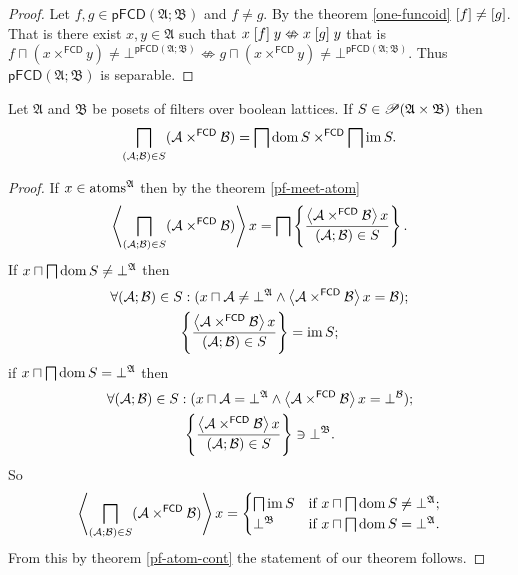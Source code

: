\begin{proof}
Let $f,g\in\mathsf{pFCD}(\mathfrak{A};\mathfrak{B})$ and $f\neq g$.
By the theorem \ref{one-funcoid} $\mathord{\mathrel{\left[f\right]}}\neq\mathord{\mathrel{\left[g\right]}}$.
That is there exist $x,y\in\mathfrak{A}$ such that $x\mathrel{\left[f\right]}y\nLeftrightarrow x\mathrel{\left[g\right]}y$
that is $f\sqcap(x\times^{\mathsf{FCD}}y)\neq\bot^{\mathsf{pFCD}(\mathfrak{A};\mathfrak{B})}\nLeftrightarrow g\sqcap(x\times^{\mathsf{FCD}}y)\neq\bot^{\mathsf{pFCD}(\mathfrak{A};\mathfrak{B})}$.
Thus $\mathsf{pFCD}(\mathfrak{A};\mathfrak{B})$ is separable.\end{proof}
\begin{thm}
Let $\mathfrak{A}$ and $\mathfrak{B}$ be posets of filters over
boolean lattices. If $S\in\mathscr{P}(\mathfrak{A}\times\mathfrak{B})$
then
\[
\bigsqcap_{(\mathcal{A};\mathcal{B})\in S}(\mathcal{A}\times^{\mathsf{FCD}}\mathcal{B})=\bigsqcap\operatorname{dom} S\times^{\mathsf{FCD}}\bigsqcap\operatorname{im} S.
\]
\end{thm}
\begin{proof}
If $x\in\operatorname{atoms}^{\mathfrak{A}}$ then by the theorem \ref{pf-meet-atom}
\[
\left\langle \bigsqcap_{(\mathcal{A};\mathcal{B})\in S}(\mathcal{A}\times^{\mathsf{FCD}}\mathcal{B})\right\rangle x=\bigsqcap\left\{ \frac{\left\langle \mathcal{A}\times^{\mathsf{FCD}}\mathcal{B}\right\rangle x}{(\mathcal{A};\mathcal{B})\in S}\right\}.
\]
If $x\sqcap\bigsqcap\operatorname{dom} S\ne\bot^{\mathfrak{A}}$ then
\begin{gather*}
\forall(\mathcal{A};\mathcal{B})\in S:(x\sqcap\mathcal{A}\ne\bot^{\mathfrak{A}}\land\left\langle \mathcal{A}\times^{\mathsf{FCD}}\mathcal{B}\right\rangle x=\mathcal{B});\\
\left\{ \frac{\left\langle \mathcal{A}\times^{\mathsf{FCD}}\mathcal{B}\right\rangle x}{(\mathcal{A};\mathcal{B})\in S}\right\}=\operatorname{im} S;
\end{gather*}
if $x\sqcap\bigsqcap\operatorname{dom} S=\bot^{\mathfrak{A}}$ then
\begin{gather*}
\forall(\mathcal{A};\mathcal{B})\in S:(x\sqcap\mathcal{A}=\bot^{\mathfrak{A}}\land\left\langle \mathcal{A}\times^{\mathsf{FCD}}\mathcal{B}\right\rangle x=\bot^{\mathcal{B}});\\
\left\{ \frac{\left\langle \mathcal{A}\times^{\mathsf{FCD}}\mathcal{B}\right\rangle x}{(\mathcal{A};\mathcal{B})\in S}\right\}\ni\bot^{\mathfrak{B}}.
\end{gather*}
So
\[
\left\langle \bigsqcap_{(\mathcal{A};\mathcal{B})\in S}(\mathcal{A}\times^{\mathsf{FCD}}\mathcal{B})\right\rangle x=\begin{cases}
\bigsqcap\operatorname{im} S & \text{if }x\sqcap\bigsqcap\operatorname{dom} S\ne\bot^{\mathfrak{A}};\\
\bot^{\mathfrak{B}} & \text{if }x\sqcap\bigsqcap\operatorname{dom} S=\bot^{\mathfrak{A}}.
\end{cases}
\]
From this by theorem \ref{pf-atom-cont} the statement of our theorem
follows.\end{proof}
